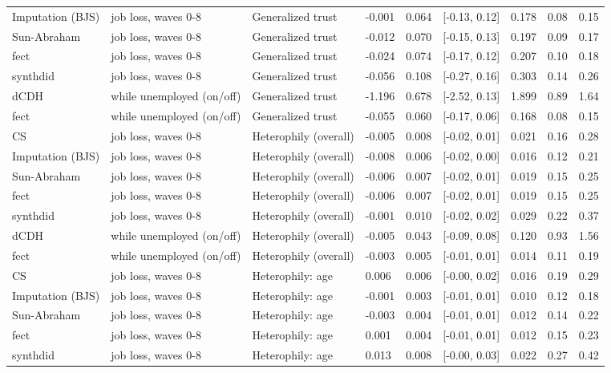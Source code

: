\begin{tabular}{lllllllll}
Imputation (BJS) & job loss, waves 0-8 & Generalized trust & -0.001 & 0.064 & {}[-0.13, 0.12] & 0.178 & 0.08 & 0.15\\
Sun-Abraham & job loss, waves 0-8 & Generalized trust & -0.012 & 0.070 & {}[-0.15, 0.13] & 0.197 & 0.09 & 0.17\\
fect & job loss, waves 0-8 & Generalized trust & -0.024 & 0.074 & {}[-0.17, 0.12] & 0.207 & 0.10 & 0.18\\
synthdid & job loss, waves 0-8 & Generalized trust & -0.056 & 0.108 & {}[-0.27, 0.16] & 0.303 & 0.14 & 0.26\\
dCDH & while unemployed (on/off) & Generalized trust & -1.196 & 0.678 & {}[-2.52, 0.13] & 1.899 & 0.89 & 1.64\\
fect & while unemployed (on/off) & Generalized trust & -0.055 & 0.060 & {}[-0.17, 0.06] & 0.168 & 0.08 & 0.15\\
CS & job loss, waves 0-8 & Heterophily (overall) & -0.005 & 0.008 & {}[-0.02, 0.01] & 0.021 & 0.16 & 0.28\\
Imputation (BJS) & job loss, waves 0-8 & Heterophily (overall) & -0.008 & 0.006 & {}[-0.02, 0.00] & 0.016 & 0.12 & 0.21\\
Sun-Abraham & job loss, waves 0-8 & Heterophily (overall) & -0.006 & 0.007 & {}[-0.02, 0.01] & 0.019 & 0.15 & 0.25\\
fect & job loss, waves 0-8 & Heterophily (overall) & -0.006 & 0.007 & {}[-0.02, 0.01] & 0.019 & 0.15 & 0.25\\
synthdid & job loss, waves 0-8 & Heterophily (overall) & -0.001 & 0.010 & {}[-0.02, 0.02] & 0.029 & 0.22 & 0.37\\
dCDH & while unemployed (on/off) & Heterophily (overall) & -0.005 & 0.043 & {}[-0.09, 0.08] & 0.120 & 0.93 & 1.56\\
fect & while unemployed (on/off) & Heterophily (overall) & -0.003 & 0.005 & {}[-0.01, 0.01] & 0.014 & 0.11 & 0.19\\
CS & job loss, waves 0-8 & Heterophily: age & 0.006 & 0.006 & {}[-0.00, 0.02] & 0.016 & 0.19 & 0.29\\
Imputation (BJS) & job loss, waves 0-8 & Heterophily: age & -0.001 & 0.003 & {}[-0.01, 0.01] & 0.010 & 0.12 & 0.18\\
Sun-Abraham & job loss, waves 0-8 & Heterophily: age & -0.003 & 0.004 & {}[-0.01, 0.01] & 0.012 & 0.14 & 0.22\\
fect & job loss, waves 0-8 & Heterophily: age & 0.001 & 0.004 & {}[-0.01, 0.01] & 0.012 & 0.15 & 0.23\\
synthdid & job loss, waves 0-8 & Heterophily: age & 0.013 & 0.008 & {}[-0.00, 0.03] & 0.022 & 0.27 & 0.42\\

\end{tabular}
